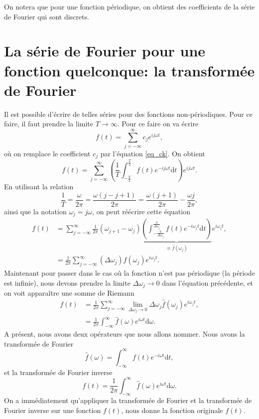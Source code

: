 \documentclass[a4paper,12pt]{book}
\newcommand{\dd}{\mathrm{d}}
\newcommand{\fh}{\hat{f}}
\renewcommand{\eqref}[1]{\ref{#1}}
\begin{document}
On notera que pour une fonction périodique, on obtient des coefficients de la série de Fourier qui sont discrets.

\section{La série de Fourier pour une fonction quelconque: la transformée de Fourier}

Il est possible d'écrire de telles séries pour des fonctions non-périodiques. Pour ce faire, il faut prendre la limite $T\rightarrow\infty$. 
Pour ce faire on va écrire
\begin{equation*}
 f(t)=\sum_{j=-\infty}^\infty c_je^{ij\omega t},
\end{equation*}
où on remplace le coefficient $c_j$ par l'équation \eqref{eq_ck}. On obtient
\begin{equation*}
 f(t)=\sum_{j=-\infty}^\infty \left(\frac{1}{T}\int_{-\frac{T}{2}}^{\frac{T}{2}}f(t)e^{-ij\omega t}\dd t\right) e^{ij\omega t}.
\end{equation*}
En utilisant la relation 
\begin{equation*}
 \frac{1}{T}=\frac{\omega}{2\pi}=\frac{\omega(j-j+1)}{2\pi}=\frac{\omega(j+1)}{2\pi}-\frac{\omega j}{2\pi},
\end{equation*}
ainsi que la notation $\omega_j=j\omega$, on peut réécrire cette équation
\begin{align}
 f(t)&=\sum_{j=-\infty}^\infty \frac{1}{2\pi}(\omega_{j+1}-\omega_j)\underbrace{\left(\int_{-\frac{\pi}{\Delta \omega_j}}^{\frac{\pi}{\Delta \omega_j}}f(t)e^{-i\omega_j t}\dd t\right)}_{\equiv \fh(\omega_j)} e^{i\omega_j t},\nonumber\\
     &=\frac{1}{2\pi}\sum_{j=-\infty}^\infty (\Delta \omega_j)\fh(\omega_j) e^{i\omega_j t}.
\end{align}
Maintenant pour passer dans le cas où la fonction n'est pas périodique (la période est infinie), nous
devons prendre la limite $\Delta \omega_j\rightarrow 0$ dans l'équation précédente, et on voit apparaître une somme de Riemann
\begin{align}
 f(t)&=\frac{1}{2\pi}\sum_{j=-\infty}^\infty \lim\limits_{\Delta \omega_j\rightarrow 0}\Delta \omega_j\fh(\omega_j) e^{i\omega_j t},\nonumber\\
 &=\frac{1}{2\pi}\int_{-\infty}^\infty \fh(\omega) e^{i\omega t}\dd\omega.
\end{align}
A présent, nous avons deux opérateurs que nous allons nommer. Nous avons la transformée de Fourier
\begin{equation}
 \fh(\omega)=\int_{-\infty}^{\infty}f(t)e^{-i\omega t}\dd t,\label{eq_fourier_transform}
\end{equation}
et la transformée de Fourier inverse
\begin{equation}
 f(t)=\frac{1}{2\pi}\int_{-\infty}^\infty \fh(\omega) e^{i\omega t}\dd\omega.\label{eq_inverse_fourier_transform}
\end{equation}
On a immédiatement qu'appliquer la transformée de Fourier et la transformée de Fourier inverse sur 
une fonction $f(t)$, nous donne la fonction originale $f(t)$.
\end{document}
